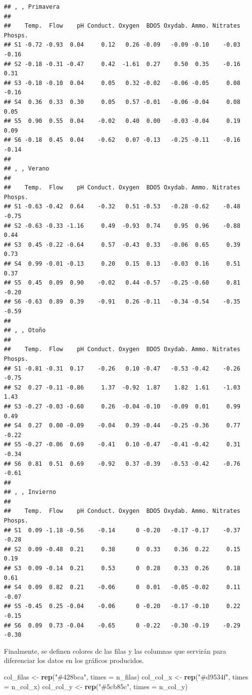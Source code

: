 \documentclass[
  spanish,
]{article}
\newenvironment{Shaded}{\begin{snugshade}}{\end{snugshade}}
\newcommand{\DataTypeTok}[1]{\textcolor[rgb]{0.13,0.29,0.53}{#1}}
\newcommand{\KeywordTok}[1]{\textcolor[rgb]{0.13,0.29,0.53}{\textbf{#1}}}
\newcommand{\NormalTok}[1]{#1}
\newcommand{\StringTok}[1]{\textcolor[rgb]{0.31,0.60,0.02}{#1}}
\begin{document}
\begin{verbatim}
## , , Primavera
## 
##    Temp.  Flow    pH Conduct. Oxygen  BDO5 Oxydab. Ammo. Nitrates Phosps.
## S1 -0.72 -0.93  0.04     0.12   0.26 -0.09   -0.09 -0.10    -0.03   -0.16
## S2 -0.18 -0.31 -0.47     0.42  -1.61  0.27    0.50  0.35    -0.16    0.31
## S3 -0.18 -0.10  0.04     0.05   0.32 -0.02   -0.06 -0.05     0.08   -0.16
## S4  0.36  0.33  0.30     0.05   0.57 -0.01   -0.06 -0.04     0.08    0.05
## S5  0.90  0.55  0.04    -0.02   0.40  0.00   -0.03 -0.04     0.19    0.09
## S6 -0.18  0.45  0.04    -0.62   0.07 -0.13   -0.25 -0.11    -0.16   -0.14
## 
## , , Verano
## 
##    Temp.  Flow    pH Conduct. Oxygen  BDO5 Oxydab. Ammo. Nitrates Phosps.
## S1 -0.63 -0.42  0.64    -0.32   0.51 -0.53   -0.28 -0.62    -0.48   -0.75
## S2 -0.63 -0.33 -1.16     0.49  -0.93  0.74    0.95  0.96    -0.88    0.44
## S3  0.45 -0.22 -0.64     0.57  -0.43  0.33   -0.06  0.65     0.39    0.73
## S4  0.99 -0.01 -0.13     0.20   0.15  0.13   -0.03  0.16     0.51    0.37
## S5  0.45  0.09  0.90    -0.02   0.44 -0.57   -0.25 -0.60     0.81   -0.20
## S6 -0.63  0.89  0.39    -0.91   0.26 -0.11   -0.34 -0.54    -0.35   -0.59
## 
## , , Otoño
## 
##    Temp.  Flow    pH Conduct. Oxygen  BDO5 Oxydab. Ammo. Nitrates Phosps.
## S1 -0.81 -0.31  0.17    -0.26   0.10 -0.47   -0.53 -0.42    -0.26   -0.75
## S2  0.27 -0.11 -0.86     1.37  -0.92  1.87    1.82  1.61    -1.03    1.43
## S3 -0.27 -0.03 -0.60     0.26  -0.04 -0.10   -0.09  0.01     0.99    0.49
## S4  0.27  0.00 -0.09    -0.04   0.39 -0.44   -0.25 -0.36     0.77   -0.22
## S5 -0.27 -0.06  0.69    -0.41   0.10 -0.47   -0.41 -0.42     0.31   -0.34
## S6  0.81  0.51  0.69    -0.92   0.37 -0.39   -0.53 -0.42    -0.76   -0.61
## 
## , , Invierno
## 
##    Temp.  Flow    pH Conduct. Oxygen  BDO5 Oxydab. Ammo. Nitrates Phosps.
## S1  0.09 -1.18 -0.56    -0.14      0 -0.20   -0.17 -0.17    -0.37   -0.28
## S2  0.09 -0.48  0.21     0.38      0  0.33    0.36  0.22     0.15    0.19
## S3  0.09 -0.14  0.21     0.53      0  0.28    0.33  0.26     0.18    0.61
## S4  0.09  0.82  0.21    -0.06      0  0.01   -0.05 -0.02     0.11   -0.07
## S5 -0.45  0.25 -0.04    -0.06      0 -0.20   -0.17 -0.10     0.22   -0.15
## S6  0.09  0.73 -0.04    -0.65      0 -0.22   -0.30 -0.19    -0.29   -0.30
\end{verbatim}

Finalmente, se definen colores de las filas y las columnas que servirán para diferenciar los datos en los gráficos producidos.

\begin{Shaded}
\begin{Highlighting}[]
\NormalTok{col\_filas \textless{}{-}}\StringTok{ }\KeywordTok{rep}\NormalTok{(}\StringTok{"\#428bca"}\NormalTok{, }\DataTypeTok{times =}\NormalTok{ n\_filas)}
\NormalTok{col\_col\_x \textless{}{-}}\StringTok{ }\KeywordTok{rep}\NormalTok{(}\StringTok{"\#d9534f"}\NormalTok{, }\DataTypeTok{times =}\NormalTok{ n\_col\_x)}
\NormalTok{col\_col\_y \textless{}{-}}\StringTok{ }\KeywordTok{rep}\NormalTok{(}\StringTok{"\#5cb85c"}\NormalTok{, }\DataTypeTok{times =}\NormalTok{ n\_col\_y)}
\end{Highlighting}
\end{Shaded}
\end{document}
